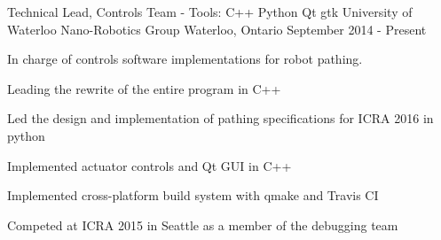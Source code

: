 \begin{cventries}

\cventry
    {Technical Lead, Controls Team - Tools: C++ \textbullet{} Python \textbullet{} Qt \textbullet{} gtk}
    {University of Waterloo Nano-Robotics Group}
    {Waterloo, Ontario}
{September 2014 - Present} %
{ %
In charge of controls software implementations for robot pathing.
\begin{cvitems}
\item[]
\item {Leading the rewrite of the entire program in C++}
\item {Led the design and implementation of pathing specifications for ICRA 2016 in python}
\item {Implemented actuator controls and Qt GUI in C++}
\item {Implemented cross-platform build system with qmake and Travis CI}
\item {Competed at ICRA 2015 in Seattle as a member of the debugging team}
\end{cvitems} 
}


\end{cventries}
